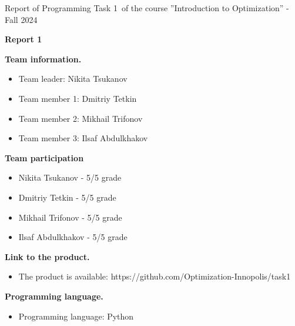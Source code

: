 \documentclass[12pt, legalpaper]{exam}
\newcommand{\course}{Introduction to Optimization}
\newcommand{\term}{Fall 2024}
\newcommand{\examnum}{Report of Programming Task 1}
\begin{document}
\noindent \examnum \, of the  course ''\course'' - \term


\noindent
{}




\vspace{12pt}
\begin{center}
    \textbf{Report 1}
\end{center}

\vspace{12pt}

\noindent  \textbf{Team information.}

\begin{itemize}
    \item Team leader: Nikita Tsukanov 
    \item Team member 1: Dmitriy Tetkin
    \item Team member 2: Mikhail Trifonov
    \item Team member 3: Ilsaf Abdulkhakov
\end{itemize}
\vspace{12pt}
\noindent  \textbf{Team participation}
\begin{itemize}
    \item Nikita Tsukanov - 5/5 grade
    \item Dmitriy Tetkin - 5/5 grade
    \item Mikhail Trifonov - 5/5 grade
    \item Ilsaf Abdulkhakov - 5/5 grade
\end{itemize}
\vspace{12pt}

\noindent     \textbf{Link to the product.}
\begin{itemize}
    \item The product is available: https://github.com/Optimization-Innopolis/task1
\end{itemize}

\vspace{12pt}

\noindent  \textbf{Programming language.}
\begin{itemize}
    \item Programming language: Python
\end{itemize}

\vspace{12pt}
\end{document}
